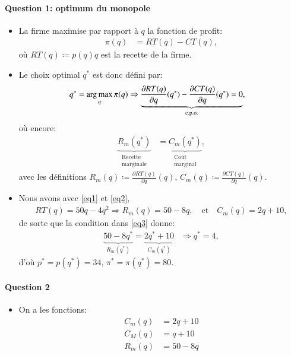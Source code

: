 \begin{frame}
[allowframebreaks]{\insertsection}
\framesubtitle{Question 1: optimum du monopole}
\begin{itemize}
\item La firme maximise par rapport à $q$  la fonction de profit:
\begin{align}
\pi(q) &= RT(q) - CT(q),
\label{eq3}
\end{align}
où $RT(q) \coloneqq p(q)q$ est la recette de la firme. 
\item Le choix optimal $q^*$  est donc défini par:
\begin{align}
q^* &=\argmax_q \pi(q) \Rightarrow \underbrace{\frac{\partial RT(q)}{\partial q}(q^*) -  \frac{\partial CT(q)}{\partial q}(q^*) = 0}_{\text{c.p.o.}}, 
\label{eq3}
\end{align}
où encore:
\begin{align*}
\underbrace{R_m(q^*)}_{\substack{\text{Recette} \\ \text{marginale}}} &= \underbrace{C_m(q^*)}_{\substack{\text{Coût} \\ \text{marginal}}}, 
\end{align*}
avec les définitions $R_m(q)\coloneqq \frac{\partial RT(q)}{\partial q}(q)$,  $C_m(q)\coloneqq \frac{\partial CT(q)}{\partial q}(q)$.

\item Nous avons avec \eqref{eq1} et \eqref{eq2},
\begin{align*}
RT(q) =  50q-4q^2 \Rightarrow R_m(q) = 50-8q, \quad \text{et} \quad C_m(q) = 2q + 10,
\end{align*}
de sorte que la condition dans \eqref{eq3} donne:
\begin{align*}
\underbrace{50-8q^*}_{R_m(q^*)} = \underbrace{2q^* + 10}_{C_m(q^*)}  &\Rightarrow q^* = 4,
\end{align*}
d'où $p^* = p(q^*) =  34$, $\pi^* = \pi(q^*) = 80$.
\end{itemize}
\end{frame}
\begin{frame}
  [allowframebreaks]{\insertsection}
  \framesubtitle{Question 2}
  \begin{itemize}
   \item On a les fonctions:
   \begin{align*}
    C_m(q) &= 2q + 10\\
    C_M(q) &= q + 10\\
    R_m(q) &= 50-8q
   \end{align*}
  \end{itemize}
\end{frame} 
